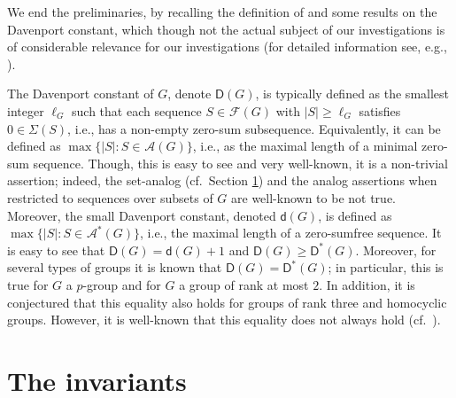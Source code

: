 \documentclass{amsart}
\theoremstyle{definition}
\numberwithin{equation}{section}
\begin{document}
We end the preliminaries, by recalling the definition of and some results on the Davenport constant, which though not the actual subject of our investigations is of considerable relevance for our investigations (for detailed information see, e.g., \cite{GaoGe1,GeHaBOOK}).

The Davenport constant of $G$, denote ${\mathsf{D}}(G)$, is typically defined as the smallest integer $\ell_G$ such that each sequence $S \in {{}^{{}}\!\mathcal{F}}(G)$ with $|S|\ge \ell_G$ satisfies $0 \in \Sigma(S)$, i.e., has a non-empty zero-sum subsequence.
Equivalently, it can be defined as $\max \{|S|\colon S \in {{}^{{}}\!\mathcal{A}} (G)\}$, i.e., as the maximal length of a minimal zero-sum sequence. Though, this is easy to see and very well-known, it is a non-trivial assertion;
indeed, the set-analog (cf.~Section \ref{sec_inv}) and the analog assertions when restricted to sequences over subsets of $G$ are well-known to be not true.
Moreover, the small Davenport constant, denoted ${\mathsf{d}}(G)$, is defined as
$\max \{|S| \colon S \in {{}^{{}}\!\mathcal{A}^{\ast}} (G)\}$, i.e., the maximal length of a zero-sumfree sequence.
It is easy to see that ${\mathsf{D}}(G) = {\mathsf{d}}(G)+1$ and ${\mathsf{D}}(G)\ge {\mathsf{D}^{\ast}}(G)$.
Moreover, for several types of groups it is known that ${\mathsf{D}}(G)={\mathsf{D}^{\ast}}(G)$;
in particular, this is true for $G$ a $p$-group and for $G$ a group of rank at most $2$. In addition, it is conjectured that this equality also holds for groups of rank three and homocyclic groups. However, it is well-known that this equality does not always hold (cf.~\cite[Section 3]{GaoGe1}).

\section{The invariants}
\label{sec_inv}
\end{document}

